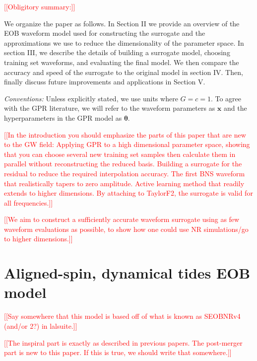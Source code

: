 \documentclass[prd,aps,letter,twocolumn,floatfix,notitlepage,nofootinbib]{revtex4-1}
\def\bx{\mathbf{x}}
\def\btheta{\boldsymbol{\theta}}
\newcommand{\red}[1]{\textcolor{red}{#1}}
\begin{document}
\red{[[Obligitory summary:]]}

We organize the paper as follows. In Section II we provide an overview of the EOB waveform model used for constructing the surrogate and the approximations we use to reduce the dimensionality of the parameter space. In section III, we describe the details of building a surrogate model, choosing training set waveforms, and evaluating the final model. We then compare the accuracy and speed of the surrogate to the original model in section IV. Then, finally discuss future improvements and applications in Section V.

\textit{Conventions:} Unless explicitly stated, we use units where $G=c=1$. To agree with the GPR literature, we will refer to the waveform parameters as $\bx$ and the hyperparameters in the GPR model as $\btheta$.

\red{[[In the introduction you should emphasize the parts of this paper that are new to the GW field: Applying GPR to a high dimensional parameter space, showing that you can choose several new training set samples then calculate them in parallel without reconstructing the reduced basis. Building a surrogate for the residual to reduce the required interpolation accuracy. The first BNS waveform that realistically tapers to zero amplitude. Active learning method that readily extends to higher dimensions. By attaching to TaylorF2, the surrogate is valid for all frequencies.]]}

\red{[[We aim to construct a sufficiently accurate waveform surrogate using as few waveform evaluations as possible, to show how one could use NR simulations/go to higher dimensions.]]}

\section{Aligned-spin, dynamical tides EOB model}

\red{[[Say somewhere that this model is based off of what is known as SEOBNRv4 (and/or 2?) in lalsuite.]]}

\red{[[The inspiral part is exactly as described in previous papers. The post-merger part is new to this paper. If this is true, we should write that somewhere.]]}
\end{document}

